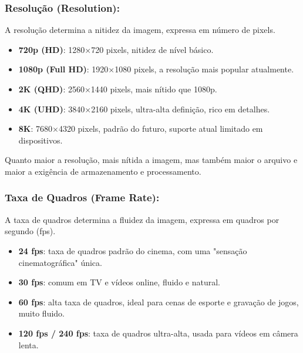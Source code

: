 


\subsubsection*{Resolução (Resolution):}

A resolução determina a nitidez da imagem, expressa em número de pixels.

\begin{itemize}
  \item \textbf{720p (HD)}: 1280×720 pixels, nitidez de nível básico.
  \item \textbf{1080p (Full HD)}: 1920×1080 pixels, a resolução mais popular atualmente.
  \item \textbf{2K (QHD)}: 2560×1440 pixels, mais nítido que 1080p.
  \item \textbf{4K (UHD)}: 3840×2160 pixels, ultra-alta definição, rico em detalhes.
  \item \textbf{8K}: 7680×4320 pixels, padrão do futuro, suporte atual limitado em dispositivos.
\end{itemize}

Quanto maior a resolução, mais nítida a imagem, mas também maior o arquivo e maior a exigência de armazenamento e processamento.

\subsubsection*{Taxa de Quadros (Frame Rate):}

A taxa de quadros determina a fluidez da imagem, expressa em quadros por segundo (fps).

\begin{itemize}
  \item \textbf{24 fps}: taxa de quadros padrão do cinema, com uma "sensação cinematográfica" única.
  \item \textbf{30 fps}: comum em TV e vídeos online, fluido e natural.
  \item \textbf{60 fps}: alta taxa de quadros, ideal para cenas de esporte e gravação de jogos, muito fluido.
  \item \textbf{120 fps / 240 fps}: taxa de quadros ultra-alta, usada para vídeos em câmera lenta.
\end{itemize}

